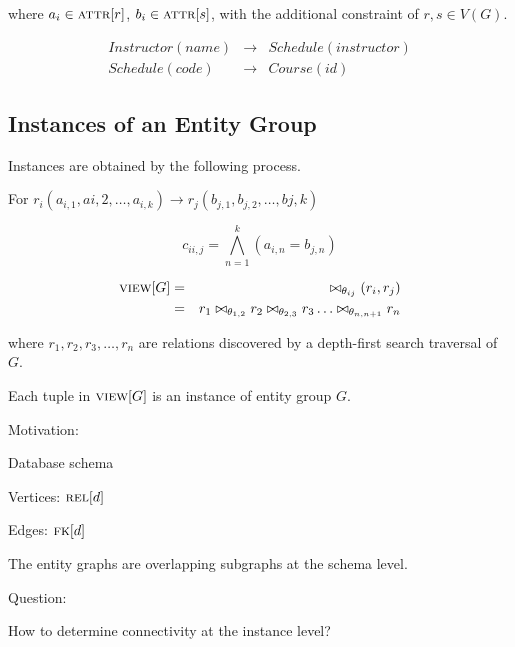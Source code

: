 		where $a_i \in \textsc{attr}\lbrack r\rbrack$, $b_i \in \textsc{attr}\lbrack s\rbrack$, with the additional constraint of $r, s \in V(G)$.
		
		\begin{ex}
			\begin{eqnarray*}
				Instructor(name) &\rightarrow& Schedule(instructor) \\
				Schedule(code) &\rightarrow& Course(id)
			\end{eqnarray*}
		\end{ex}
	
	\subsection{Instances of an Entity Group}
		
		Instances are obtained by the following process.
		
		For $r_i(a_{i, 1}, a{i, 2}, \ldots, a_{i, k}) \rightarrow r_j(b_{j, 1}, b_{j, 2}, \ldots, b{j, k})$
		
		$$c_{ii, j} = \bigwedge^k_{n=1} (a_{i, n} = b_{j, n})$$
		
		\begin{eqnarray*}
			\textsc{view}\lbrack G\rbrack &=& \bowtie_{\theta_{ij}} (r_i, r_j) \\
			&=& r_1 \bowtie_{\theta_{1, 2}} r_2 \bowtie_{\theta_{2, 3}} r_3 \ldots \bowtie_{\theta_{n, n+1}} r_n
		\end{eqnarray*}
		
		where $r_1, r_2, r_3, \ldots, r_n$ are relations discovered by a depth-first search traversal of $G$.
		
		Each tuple in $\textsc{view}\lbrack G\rbrack$ is an instance of entity group $G$.
		
		Motivation:
		
		
		Database schema
		
		Vertices:  $\textsc{rel}\lbrack d\rbrack$
		
		Edges:  $\textsc{fk}\lbrack d\rbrack$
		
		The entity graphs are overlapping subgraphs at the schema level.
		
		Question:
		
		How to determine connectivity at the instance level?
	
